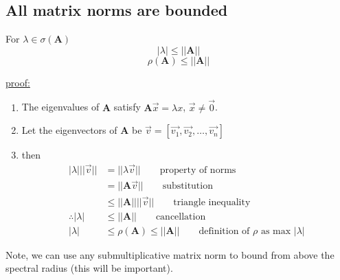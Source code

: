 \documentclass[12pt]{article}
\newcommand{\ve}[1]{\ensuremath{\mathbf{#1}}}
\begin{document}
\subsection{All matrix norms are bounded}

For $\lambda \in \sigma(\ve{A})$ 
\[|\lambda | \leq ||\ve{A}||\]
\[\rho(\ve{A}) \leq ||\ve{A}||\]

\underline{proof:} 
\begin{enumerate}
\item The eigenvalues of $\ve{A}$ satisfy $\ve{A}\vec{x} = \lambda x$, $\vec{x} \neq \vec{0}$. 

\item Let the eigenvectors of $\ve{A}$ be $\vec{v} = [\vec{v_1}, \vec{v_2}, \dots, \vec{v_n}]$

\item then 
\begin{align}
|\lambda | ||\vec{v}|| &= ||\lambda \vec{v}|| 
\qquad \text{property of norms} \nonumber \\
%
                     &= ||\ve{A}\vec{v}|| 
                     \qquad \text{substitution} \nonumber \\
%
                     &\leq ||\ve{A}|| ||\vec{v}||
                     \qquad \text{triangle inequality} \nonumber \\
%
\therefore |\lambda | &\leq ||\ve{A}|| 
\qquad \text{cancellation}\nonumber \\
%
|\lambda| &\leq \rho(\ve{A}) \leq ||\ve{A}|| 
\qquad \text{definition of }\rho\text{ as max }|\lambda | \nonumber
\end{align}
\end{enumerate}

Note, we can use any submultiplicative matrix norm to bound from above the spectral radius (this will be important).
\end{document}
